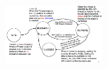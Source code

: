 \documentclass[a4paper]{article}
\begin{document}
\begin{multicols*}{3}
    \inputminted[rulecolor=green]{java}{./Basic.java}
    \vspace{-0.5cm}
    \inputminted[rulecolor=red]{java}{./OOP.java}
    \vspace{-0.5cm}
    \inputminted[rulecolor=blue]{java}{./Seralization.java}
    \inputminted[rulecolor=orange]{java}{./GUI.java}
    \includegraphics[width=0.27\textwidth]{./threading.png}
    \inputminted[rulecolor=magenta]{java}{./Socket.java}
    \vspace{-0.5cm}
    \inputminted[rulecolor=black]{java}{./Garbage.java}
\end{multicols*}
\end{document}
